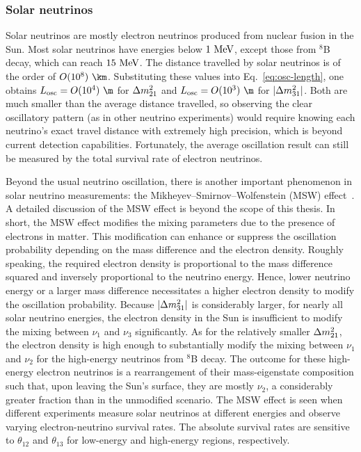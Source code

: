 \subsubsection{Solar neutrinos}
Solar neutrinos are mostly electron neutrinos produced from nuclear fusion in the Sun.
Most solar neutrinos have energies below $1~\textrm{MeV}$, except those from $^8$B decay, which can reach $15~\textrm{MeV}$.
The distance travelled by solar neutrinos is of the order of $O(10^8)~\km$.
Substituting these values into Eq.~\ref{eq:osc-length}, one obtains $L_{\text{osc}} = O(10^4)~\m$ for $\Delta m^2_{21}$ and $L_{\text{osc}} = O(10^3)~\m$ for $|\Delta m^2_{31}|$.
Both are much smaller than the average distance travelled, so observing the clear oscillatory pattern (as in other neutrino experiments) would require knowing each neutrino’s exact travel distance with extremely high precision, which is beyond current detection capabilities.
Fortunately, the average oscillation result can still be measured by the total survival rate of electron neutrinos.

Beyond the usual neutrino oscillation, there is another important phenomenon in solar neutrino measurements: the Mikheyev–Smirnov–Wolfenstein (MSW) effect~\cite{Wolfenstein:1977ue,Mikheyev:1985zog}.
A detailed discussion of the MSW effect is beyond the scope of this thesis.
In short, the MSW effect modifies the mixing parameters due to the presence of electrons in matter.
This modification can enhance or suppress the oscillation probability depending on the mass difference and the electron density.
Roughly speaking, the required electron density is proportional to the mass difference squared and inversely proportional to the neutrino energy.
Hence, lower neutrino energy or a larger mass difference necessitates a higher electron density to modify the oscillation probability.
Because $|\Delta m^2_{31}|$ is considerably larger, for nearly all solar neutrino energies, the electron density in the Sun is insufficient to modify the mixing between $\nu_1$ and $\nu_3$ significantly.
As for the relatively smaller $\Delta m^2_{21}$, the electron density is high enough to substantially modify the mixing between $\nu_1$ and $\nu_2$ for the high-energy neutrinos from $^8$B decay.
The outcome for these high-energy electron neutrinos is a rearrangement of their mass-eigenstate composition such that, upon leaving the Sun’s surface, they are mostly $\nu_2$, a considerably greater fraction than in the unmodified scenario.
The MSW effect is seen when different experiments measure solar neutrinos at different energies and observe varying electron-neutrino survival rates.
The absolute survival rates are sensitive to $\theta_{12}$ and $\theta_{13}$ for low-energy and high-energy regions, respectively.

